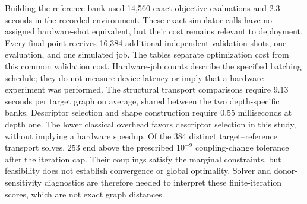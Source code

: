 Building the reference bank used 14,560 exact objective evaluations and 2.3 seconds in the recorded environment. These exact simulator calls have no assigned hardware-shot equivalent, but their cost remains relevant to deployment. Every final point receives 16,384 additional independent validation shots, one evaluation, and one simulated job. The tables separate optimization cost from this common validation cost. Hardware-job counts describe the specified batching schedule; they do not measure device latency or imply that a hardware experiment was performed.
The structural transport comparisons require 9.13 seconds per target graph on average, shared between the two depth-specific banks. Descriptor selection and shape construction require 0.55 milliseconds at depth one. The lower classical overhead favors descriptor selection in this study, without implying a hardware speedup.
Of the 384 distinct target--reference transport solves, 253 end above the prescribed $10^{-9}$ coupling-change tolerance after the iteration cap. Their couplings satisfy the marginal constraints, but feasibility does not establish convergence or global optimality. Solver and donor-sensitivity diagnostics are therefore needed to interpret these finite-iteration scores, which are not exact graph distances.
